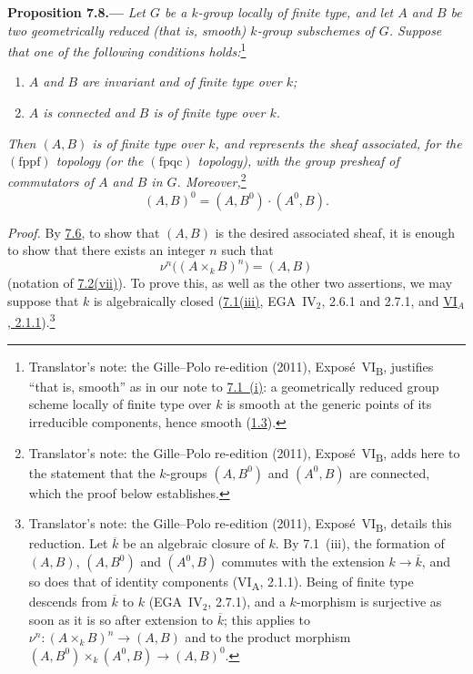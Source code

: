 
\medskip
{}\label{prop:sga3-VIB-7.8}%
\noindent\textbf{Proposition 7.8.---}
\emph{Let \(G\) be a \(k\)-group locally of finite type, and
let \(A\) and \(B\) be two geometrically reduced
\textup{(}that is, smooth\textup{)} \(k\)-group subschemes of
\(G\). Suppose that one of the following conditions holds:}\footnote{Translator's note: the Gille--Polo
re-edition (2011), Exposé~VI\textsubscript{B}, justifies ``that is, smooth'' as in our note to
\hyperref[concl:sga3-VIB-7.1-i]{7.1~(i)}: a geometrically reduced group scheme locally of finite type
over \(k\) is smooth at the generic points of its irreducible components, hence smooth
(\hyperref[prop:sga3-VIB-1.3]{1.3}).}
\begin{enumerate}
\item[\textup{a)}]\label{cond:sga3-VIB-7.8-a}
  \emph{\(A\) and \(B\) are invariant and of finite type over
  \(k\);}
\item[\textup{b)}]\label{cond:sga3-VIB-7.8-b}
  \emph{\(A\) is connected and \(B\) is of finite type over
  \(k\).}
\end{enumerate}
\emph{Then \((A,B)\) is of finite type over \(k\), and
represents the sheaf associated, for the \((\mathrm{fppf})\)
topology (or the \((\mathrm{fpqc})\) topology), with the group
presheaf of commutators of \(A\) and \(B\) in \(G\).
Moreover,}\footnote{Translator's note: the Gille--Polo re-edition (2011), Exposé~VI\textsubscript{B}, adds here
to the statement that the \(k\)-groups \((A,B^0)\) and \((A^0,B)\) are connected, which the proof below
establishes.}
\label{form:sga3-VIB-7.8-identity-component}%
\[
  (A,B)^0=(A,B^0)\cdot(A^0,B).
\]

\emph{Proof.}
By \hyperref[prop:sga3-VIB-7.6]{7.6}, to show that \((A,B)\)
is the desired associated sheaf, it is enough to show that
there exists an integer \(n\) such that
\label{form:sga3-VIB-7.8-finite-generation}%
\[
  \nu^n\bigl((A\times_kB)^n\bigr)=(A,B)
\]
\textup{(}notation of
\hyperref[def:sga3-VIB-7.2-vii]{7.2\textup{(vii)}}\textup{)}. To
prove this, as well as the other two assertions, we may suppose
that \(k\) is algebraically closed
(\hyperref[concl:sga3-VIB-7.1-iii]{7.1\textup{(iii)}},
EGA~IV\(_2\), 2.6.1 and 2.7.1, and
\hyperref[prop:sga3-VIA-2.1.1]{VI\(_A\), 2.1.1}).\footnote{Translator's note: the Gille--Polo re-edition
(2011), Exposé~VI\textsubscript{B}, details this reduction. Let \(\overline k\) be an algebraic closure of \(k\).
By 7.1~(iii), the formation of \((A,B)\), \((A,B^0)\) and \((A^0,B)\) commutes with the extension
\(k\to\overline k\), and so does that of identity components (VI\textsubscript{A}, 2.1.1). Being of finite type
descends from \(\overline k\) to \(k\) (EGA~IV\(_2\), 2.7.1), and a \(k\)-morphism is surjective as soon as it
is so after extension to \(\overline k\); this applies to \(\nu^n\colon(A\times_kB)^n\to(A,B)\) and to the
product morphism \((A,B^0)\times_k(A^0,B)\to(A,B)^0\).}


